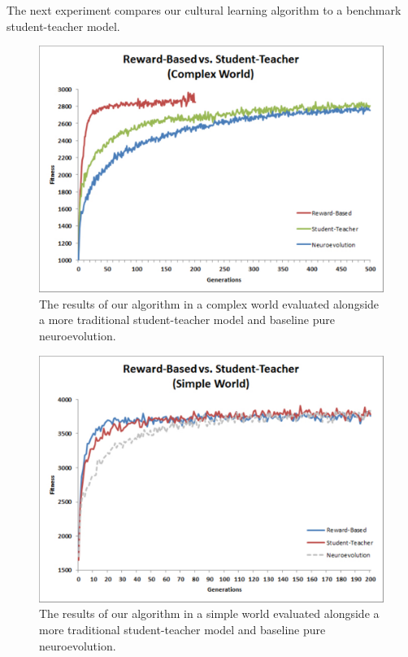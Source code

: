 \documentclass{acm_proc_article-sp}
\begin{document}
The next experiment compares our cultural learning algorithm to a benchmark student-teacher model.

\begin{figure}
  \centering
    \includegraphics[scale=.35]{complex_reward_based_vs_student_teacher.pdf}
  \caption{The results of our algorithm in a complex world evaluated alongside a more traditional student-teacher model and baseline pure neuroevolution.}
  \label{fig:reward-studetteacher}
\end{figure}
\begin{figure}
  \centering
    \includegraphics[scale=.35]{simple_reward_based_vs_student_teacher.pdf}
  \caption{The results of our algorithm in a simple world evaluated alongside a more traditional student-teacher model and baseline pure neuroevolution.}
  \label{fig:reward-studetteacher}
\end{figure}
\end{document}

